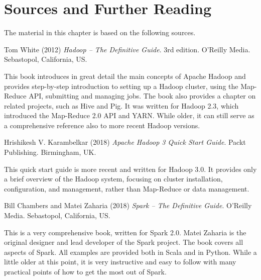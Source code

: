 %
%

\section*{Sources and Further Reading}

The material in this chapter is based on the following sources.

\begin{tcolorbox}[colback=alert]
Tom White (2012) \emph{Hadoop -- The Definitive Guide}. 3rd edition. O'Reilly Media. Sebastopol, California, US.
\end{tcolorbox}

This book introduces in great detail the main concepts of Apache Hadoop and provides step-by-step introduction to setting up a Hadoop cluster, using the Map-Reduce API, submitting and managing jobs. The book also provides a chapter on related projects, such as Hive and Pig. It was written for Hadoop 2.3, which introduced the Map-Reduce 2.0 API and YARN. While older, it can still serve as a comprehensive reference also to more recent Hadoop versions.

\begin{tcolorbox}[colback=alert]
Hrishikesh V. Karambelkar (2018) \emph{Apache Hadoop 3 Quick Start Guide}. Packt Publishing. Birmingham, UK.
\end{tcolorbox}

This quick start guide is more recent and written for Hadoop 3.0. It provides only a brief overview of the Hadoop system, focusing on cluster installation, configuration, and management, rather than Map-Reduce or data management.

\begin{tcolorbox}[colback=alert]
Bill Chambers and Matei Zaharia (2018) \emph{Spark -- The Definitive Guide}. O'Reilly Media. Sebastopol, California, US.
\end{tcolorbox}

This is a very comprehensive book, written for Spark 2.0. Matei Zaharia is the original designer and lead developer of the Spark project. The book covers all aspects of Spark. All examples are provided both in Scala and in Python. While a little older at this point, it is very instructive and easy to follow with many practical points of how to get the most out of Spark.

